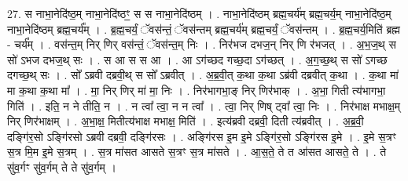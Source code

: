 \documentclass[17pt]{extarticle}
\begin{document}
27. स नाभा॒नेदि॑ष्ठ॒म् नाभा॒नेदि॑ष्ठꣳ॒॒ स स नाभा॒नेदि॑ष्ठम् । . नाभा॒नेदि॑ष्ठम् ब्रह्म॒चर्य॑म् ब्रह्म॒चर्य॒म् नाभा॒नेदि॑ष्ठ॒म् नाभा॒नेदि॑ष्ठम् ब्रह्म॒चर्य᳚म् । . ब्र॒ह्म॒चर्यं॒ ॅवस॑न्तं॒ ॅवस॑न्तम् ब्रह्म॒चर्य॑म् ब्रह्म॒चर्यं॒ ॅवस॑न्तम् । . ब्र॒ह्म॒चर्य॒मिति॑ ब्रह्म - चर्य᳚म् । . वस॑न्त॒म् निर् णिर् वस॑न्तं॒ ॅवस॑न्त॒म् निः । . निर॑भज दभज॒न् निर् णि र॑भजत् । . अ॒भ॒ज॒थ् स सो॑ ऽभज दभज॒थ् सः । . स आ स स आ । . आ ऽग॑च्छद गच्छ॒दा ऽग॑च्छत् । . अ॒ग॒च्छ॒थ् स सो॑ ऽगच्छ दगच्छ॒थ् सः । . सो᳚ ऽब्रवी दब्रवी॒थ् स सो᳚ ऽब्रवीत् । . अ॒ब्र॒वी॒त् क॒था क॒था ऽब्र॑वी दब्रवीत् क॒था । . क॒था मा॑ मा क॒था क॒था मा᳚ । . मा॒ निर् णिर् मा॑ मा॒ निः । . निर॑भागभा॒ङ् निर् णिर॑भाक् । . अ॒भा॒ गिती त्य॑भागभा॒ गिति॑ । . इति॒ न ने तीति॒ न । . न त्वा᳚ त्वा॒ न न त्वा᳚ । . त्वा॒ निर् णिष् ट्वा᳚ त्वा॒ निः । . निर॑भाक्ष मभाक्ष॒म् निर् णिर॑भाक्षम् । . अ॒भा॒क्ष॒ मितीत्य॑भाक्ष मभाक्ष॒ मिति॑ । . इत्य॑ब्रवी दब्रवी॒ दिती त्य॑ब्रवीत् । . अ॒ब्र॒वी॒ दङ्गि॑र॒सो ऽङ्गि॑रसो ऽब्रवी दब्रवी॒ दङ्गि॑रसः । . अङ्गि॑रस इ॒म इ॒मे ऽङ्गि॑र॒सो ऽङ्गि॑रस इ॒मे । . इ॒मे स॒त्रꣳ स॒त्र मि॒म इ॒मे स॒त्रम् । . स॒त्र मा॑सत आसते स॒त्रꣳ स॒त्र मा॑सते । . आ॒स॒ते॒ ते त आ॑सत आसते॒ ते । . ते सु॑व॒र्गꣳ सु॑व॒र्गम् ते ते सु॑व॒र्गम् । \newline
\end{document}
